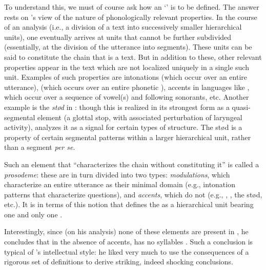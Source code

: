 To understand this, we must of course ask how an `' is to be
defined. The answer rests on {\Hjelmslev}'s view of the nature of
phonologically relevant properties. In the course of an analysis
(i.e., a division of a text into successively smaller hierarchical
units), one eventually arrives at units that cannot be further
subdivided (essentially, at the division of the utterance into
segments). These units can be said to constitute the chain that is a
text. But in addition to these, other relevant properties appear in
the text which are not localized uniquely in a single such
unit. Examples of such properties are intonations (which occur over an
entire utterance),  (which occurs over an entire phonetic
),  accents in languages like , which occur
over a sequence of vowel(s) and following sonorants, etc. Another
example is the \emph{stød} in : though this is realized in its
strongest form \citep{gronnum.basboll01:stod,gronnum.etal13:stod} as a
quasi-segmental element (a glottal stop, with associated perturbation
of laryngeal activity), {\Hjelmslev} analyzes it as a signal for certain
types of  structure. The stød is a property of certain
segmental patterns within a larger hierarchical unit, rather than a
segment \emph{per se}.

Such an element that ``characterizes the chain without constituting
it'' is called a \emph{prosodeme}: these are in turn divided into two
types: \emph{modulations}, which characterize an entire utterance as
their minimal domain (e.g., intonation patterns that characterize
questions), and \emph{accents}, which do not (e.g., , 
, the stød, etc.). It is in terms of this notion that {\Hjelmslev}
defines the  as a hierarchical unit bearing one and only one
.

Interestingly, since (on his analysis) none of these elements are
present in , he concludes that in the absence of accents, 
has no syllables \citep{hjelmslev39:syllable}. Such a conclusion is
typical of {\Hjelmslev}'s intellectual style: he liked very much to use
the consequences of a rigorous set of definitions to derive striking,
indeed shocking conclusions.

